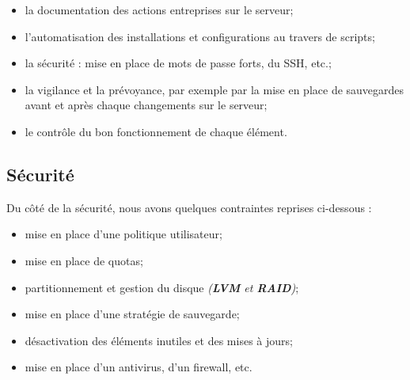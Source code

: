 \begin{itemize}
    \item la documentation des actions entreprises sur le serveur;
    \item l'automatisation des installations et configurations au travers de scripts;
    \item la sécurité : mise en place de mots de passe forts, du SSH, etc.;
    \item la vigilance et la prévoyance, par exemple par la mise en place de
    sauvegardes avant et après chaque changements sur le serveur;
    \item le contrôle du bon fonctionnement de chaque élément.
\end{itemize}


\subsection{Sécurité}
\label{sec:securite}

Du côté de la sécurité, nous avons quelques contraintes reprises ci-dessous :

\begin{itemize}
    \item mise en place d'une politique utilisateur;
    \item mise en place de quotas;
    \item partitionnement et gestion du disque \textit{(\textbf{LVM} et
    \textbf{RAID})};
    \item mise en place d'une stratégie de sauvegarde;
    \item désactivation des éléments inutiles et des mises à jours;
    \item mise en place d'un antivirus, d'un firewall, etc.
\end{itemize}

